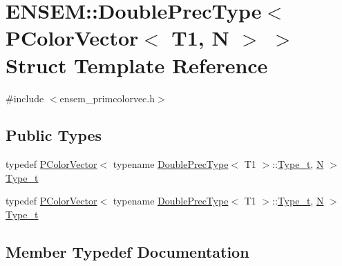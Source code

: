 \hypertarget{structENSEM_1_1DoublePrecType_3_01PColorVector_3_01T1_00_01N_01_4_01_4}{}\section{E\+N\+S\+EM\+:\+:Double\+Prec\+Type$<$ P\+Color\+Vector$<$ T1, N $>$ $>$ Struct Template Reference}
\label{structENSEM_1_1DoublePrecType_3_01PColorVector_3_01T1_00_01N_01_4_01_4}


{\ttfamily \#include $<$ensem\+\_\+primcolorvec.\+h$>$}

\subsection*{Public Types}
\begin{DoxyCompactItemize}
\item 
typedef \mbox{\hyperlink{classENSEM_1_1PColorVector}{P\+Color\+Vector}}$<$ typename \mbox{\hyperlink{structENSEM_1_1DoublePrecType}{Double\+Prec\+Type}}$<$ T1 $>$\+::\mbox{\hyperlink{structENSEM_1_1DoublePrecType_3_01PColorVector_3_01T1_00_01N_01_4_01_4_af7639042ca77d3429dc5dc974ef5c87d}{Type\+\_\+t}}, \mbox{\hyperlink{operator__name__util_8cc_a7722c8ecbb62d99aee7ce68b1752f337}{N}} $>$ \mbox{\hyperlink{structENSEM_1_1DoublePrecType_3_01PColorVector_3_01T1_00_01N_01_4_01_4_af7639042ca77d3429dc5dc974ef5c87d}{Type\+\_\+t}}
\item 
typedef \mbox{\hyperlink{classENSEM_1_1PColorVector}{P\+Color\+Vector}}$<$ typename \mbox{\hyperlink{structENSEM_1_1DoublePrecType}{Double\+Prec\+Type}}$<$ T1 $>$\+::\mbox{\hyperlink{structENSEM_1_1DoublePrecType_3_01PColorVector_3_01T1_00_01N_01_4_01_4_af7639042ca77d3429dc5dc974ef5c87d}{Type\+\_\+t}}, \mbox{\hyperlink{operator__name__util_8cc_a7722c8ecbb62d99aee7ce68b1752f337}{N}} $>$ \mbox{\hyperlink{structENSEM_1_1DoublePrecType_3_01PColorVector_3_01T1_00_01N_01_4_01_4_af7639042ca77d3429dc5dc974ef5c87d}{Type\+\_\+t}}
\end{DoxyCompactItemize}


\subsection{Member Typedef Documentation}
\mbox{\label{structENSEM_1_1DoublePrecType_3_01PColorVector_3_01T1_00_01N_01_4_01_4_af7639042ca77d3429dc5dc974ef5c87d}} 
